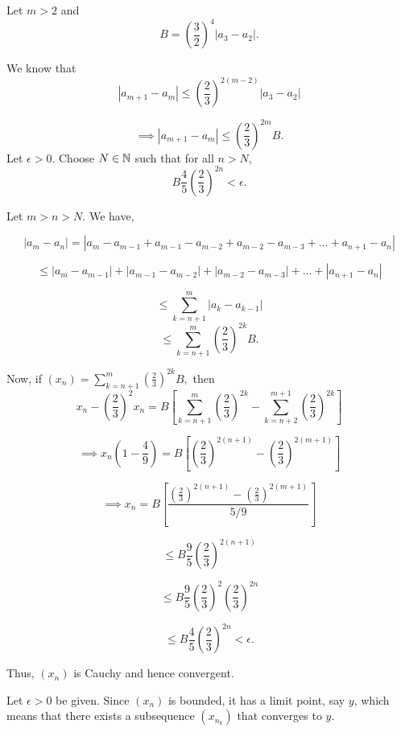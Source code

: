 \documentclass{report}
\begin{document}
\begin{myproof}

Let $m>2$ and $$B =\left(\frac{3}{2}\right)^{4}\left|a_3 -a_2\right|.$$

We know that  
$$ \left|a_{m+1} - a_m\right| \leq \left(\frac{2}{3}\right)^{2(m-2)} \left|a_3 -a_2\right|$$

$$ \implies \left|a_{m+1} - a_m\right| \leq \left(\frac{2}{3}\right)^{2m}B.$$
Let $\epsilon > 0.$ Choose $N\in\NN$ such that for all $n > N$, $$ B \frac{4}{5}\left(\frac{2}{3}\right)^{2n}< \epsilon.$$

Let $m > n > N.$ We have,

$$|a_m - a_n|= |a_m - a_{m-1} + a_{m-1} - a_{m-2}  + a_{m-2} - a_{m-3}+ \dots+ a_{n+1} -  a_{n}| $$

$$\leq |a_m - a_{m-1}| + |a_{m-1} - a_{m-2}|  + 
|a_{m-2} -  a_{m-3}| + \dots + | a_{n+1} -  a_{n}| $$

$$ \leq \sum_{k={n+1}}^{m} |a_k - a_{k-1}|$$
$$ \leq \sum_{k={n+1}}^{m} \left(\frac{2}{3}\right)^{2k}B  .$$


Now, if $(x_n)= \sum_{k={n+1}}^{m} \left(\frac{2}{3}\right)^{2k}B , $ then
$$x_n - \left(\frac{2}{3}\right)^2x_n = B\left[\sum_{k={n+1}}^{m}\left(\frac{2}{3}\right)^{2k} - \sum_{k={n+2}}^{m+1}\left(\frac{2}{3}\right)^{2k}\right]$$

$$\implies x_n\left(1 - \frac{4}{9}\right) = B\left[ \left(\frac{2}{3}\right)^{2(n+1)}- \left(\frac{2}{3}\right)^{2(m+1)}\right] $$

$$\implies x_n = B\left[\frac{\left(\frac{2}{3}\right)^{2(n+1)}- \left(\frac{2}{3}\right)^{2(m+1)}}{5/9}\right] $$

$$\leq B\frac{9}{5}\left(\frac{2}{3}\right)^{2(n+1)}$$

$$\leq B\frac{9}{5}\left(\frac{2}{3}\right)^{2}\left(\frac{2}{3}\right)^{2n}$$

$$\leq B \frac{4}{5}\left(\frac{2}{3}\right)^{2n} < \epsilon.$$


Thus, $(x_n)$ is Cauchy and hence convergent.

    
\end{myproof}

\pagebreak
{}

Let $\epsilon>0$ be given. Since $\left(x_n\right)$ is bounded, it has a limit point, say $y$, which means that there exists a subsequence $\left(x_{n_k}\right)$ that converges to $y$. 
\end{document}
